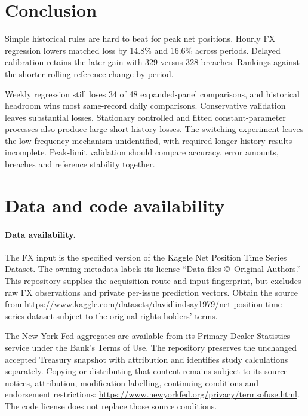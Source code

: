 \documentclass[11pt,a4paper]{article}
\begin{document}
\FloatBarrier

\section{Conclusion}\label{sec:conclusion}

Simple historical rules are hard to beat for peak net positions. Hourly FX regression lowers matched loss by 14.8\% and 16.6\% across periods. Delayed calibration retains the later gain with 329 versus 328 breaches. Rankings against the shorter rolling reference change by period.

Weekly regression still loses 34 of 48 expanded-panel comparisons, and historical headroom wins most same-record daily comparisons. Conservative validation leaves substantial losses. Stationary controlled and fitted constant-parameter processes also produce large short-history losses. The switching experiment leaves the low-frequency mechanism unidentified, with required longer-history results incomplete. Peak-limit validation should compare accuracy, error amounts, breaches and reference stability together.

\FloatBarrier

\section*{Data and code availability}
\paragraph{Data availability.} The FX input is the specified version of the Kaggle Net Position Time Series Dataset. The owning metadata labels its license ``Data files \copyright\ Original Authors.'' This repository supplies the acquisition route and input fingerprint, but excludes raw FX observations and private per-issue prediction vectors. Obtain the source from \url{https://www.kaggle.com/datasets/davidlindsay1979/net-position-time-series-dataset} subject to the original rights holders' terms.

The New York Fed aggregates are available from its Primary Dealer Statistics service under the Bank's Terms of Use. The repository preserves the unchanged accepted Treasury snapshot with attribution and identifies study calculations separately. Copying or distributing that content remains subject to its source notices, attribution, modification labelling, continuing conditions and endorsement restrictions: \url{https://www.newyorkfed.org/privacy/termsofuse.html}. The code license does not replace those source conditions.
\end{document}
